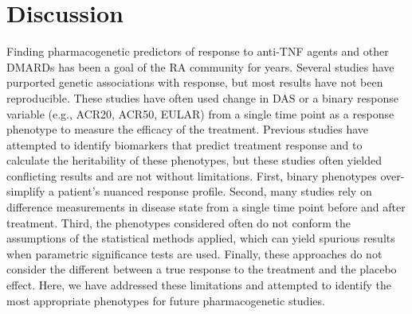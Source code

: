 

\section*{Discussion}

Finding pharmacogenetic predictors of response to anti-TNF agents and other DMARDs has been a goal of the RA community for years. Several studies have purported genetic associations with response, but most results have not been reproducible. These studies have often used change in DAS or a binary response variable (e.g., ACR20, ACR50, EULAR) from a single time point as a response phenotype to measure the efficacy of the treatment. Previous studies have attempted to identify biomarkers that predict treatment response and to calculate the heritability of these phenotypes, but these studies often yielded conflicting results and are not without limitations. First, binary phenotypes over-simplify a patient's nuanced response profile. Second, many studies rely on difference measurements in disease state from a single time point before and after treatment. Third, the phenotypes considered often do not conform the assumptions of the statistical methods applied, which can yield spurious results when parametric significance tests are used. Finally, these approaches do not consider the different between a true response to the treatment and the placebo effect. Here, we have addressed these limitations and attempted to identify the most appropriate phenotypes for future pharmacogenetic studies.

